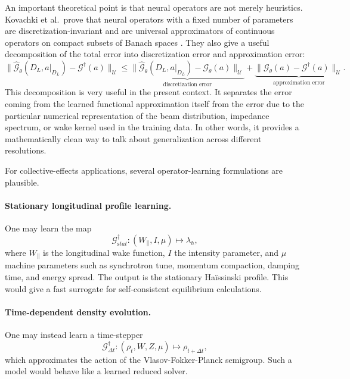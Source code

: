 \documentclass[11pt,a4paper]{article}
\begin{document}
\begin{sloppypar}
An important theoretical point is that neural operators are not merely heuristics. Kovachki et al.\ prove that neural operators with a fixed number of parameters are discretization-invariant and are universal approximators of continuous operators on compact subsets of Banach spaces \cite{kovachki_neural_nodate}. They also give a useful decomposition of the total error into discretization error and approximation error:
\begin{equation}
\|\hat{\mathcal G}_\theta(D_L,a|_{D_L})-\mathcal G^\dagger(a)\|_{\mathcal U}
\le
\underbrace{\|\hat{\mathcal G}_\theta(D_L,a|_{D_L})-\mathcal G_\theta(a)\|_{\mathcal U}}_{\text{discretization error}}
+
\underbrace{\|\mathcal G_\theta(a)-\mathcal G^\dagger(a)\|_{\mathcal U}}_{\text{approximation error}}.
\label{eq:NO_error_decomp}
\end{equation}
This decomposition is very useful in the present context. It separates the error coming from the learned functional approximation itself from the error due to the particular numerical representation of the beam distribution, impedance spectrum, or wake kernel used in the training data. In other words, it provides a mathematically clean way to talk about generalization across different resolutions.

For collective-effects applications, several operator-learning formulations are plausible.

\paragraph{ Stationary longitudinal profile learning.}
One may learn the map
\begin{equation}
\mathcal G^\dagger_{\mathrm stat}:
(W_{\parallel},I,\mu)
\mapsto
\lambda_h,
\label{eq:NO_statmap}
\end{equation}
where \(W_{\parallel}\) is the longitudinal wake function, \(I\) the intensity parameter, and \(\mu\) machine parameters such as synchrotron tune, momentum compaction, damping time, and energy spread. The output is the stationary Ha\"issinski profile. This would give a fast surrogate for self-consistent equilibrium calculations.

\paragraph{ Time-dependent density evolution.}
One may instead learn a time-stepper
\begin{equation}
\mathcal G^\dagger_{\Delta t}:
(\rho_t,W,Z,\mu)
\mapsto
\rho_{t+\Delta t},
\label{eq:NO_timestepping}
\end{equation}
which approximates the action of the Vlasov-Fokker-Planck semigroup. Such a model would behave like a learned reduced solver.


\end{sloppypar}
\end{document}
